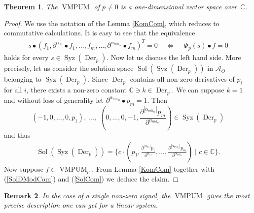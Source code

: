 \documentclass[a4paper,10pt]{article}
\newtheorem{Th}{Theorem}[section]
\newtheorem{remark}[Th]{Remark}
\theoremstyle{nonumberplain}
\newtheorem{proof}{Proof}
\newcommand{\C}{\mathbb{C}}
\DeclareMathOperator{\Der}{Der}
\DeclareMathOperator{\VMPUM}{VMPUM}
\DeclareMathOperator{\Sol}{Sol}
\DeclareMathOperator{\Syz}{Syz}
\begin{document}
\begin{Th}\label{CDimension}
 The $\VMPUM$ of $p \neq 0$ is a one-dimensional vector space over~$\C$.
\end{Th}
\begin{proof}
We use the notation of the Lemma \ref{KomCom}, which reduces to commutative calculations. It is easy to see that the equivalence  
\begin{align}\label{SolDModCom}
 s \bullet (f_1, \partial^{\alpha_{11}} \bullet f_1, \dots, f_m, \dots, \partial^{\alpha_{mh_m}} \bullet f_m)^T = 0 
\;\;\;\; \Leftrightarrow \;\;\;\; \Phi_p(s) \bullet f =0 
\end{align}
holds for every $ s \in \Syz(\Der_p) $. Now let us discuss the left hand side. More precisely, let us consider the solution space $\Sol(\Syz(\Der_p))$ in $\mathcal{A}_O$ belonging to $\Syz(\Der_p)$. Since $\Der_p$ contains 
all non-zero derivatives of $p_i$ for all $i$, there exists a non-zero constant ${\C} \ni k \in \Der_p$. 
We can suppose $k=1$ and without loss of generality let 
$\partial^{\alpha_{mh_m}} \bullet p_m=1$. Then 
$$(-1, 0, \dots, 0, p_1), \; \dots, \;
(0, \dots, 0, -1, \frac{\partial^{|\alpha_{mh_m}|}p_m}{\partial^{\alpha_{mh_m}}}) \in \Syz(\Der_p)$$
and thus 
\begin{align}\label{SolCom}
 \Sol(\Syz(\Der_p)) = \lbrace c \cdot (p_1, \frac{\partial^{|\alpha_{11}|}p_1}{\partial^{\alpha_{11}}}, \dots, \frac{\partial^{|\alpha_{mh_m}|}p_m}{\partial^{\alpha_{mh_m}}}) \; | \; c \in {\C} \rbrace.
\end{align}
Now suppose $f \in \VMPUM_p$. From Lemma \ref{KomCom} together with (\ref{SolDModCom}) and (\ref{SolCom}) we deduce the claim.
\end{proof}


\begin{remark}
 In the case of a single non-zero signal, the $\VMPUM$ gives the most precise description one can get for a linear system.
\end{remark}
\end{document}
